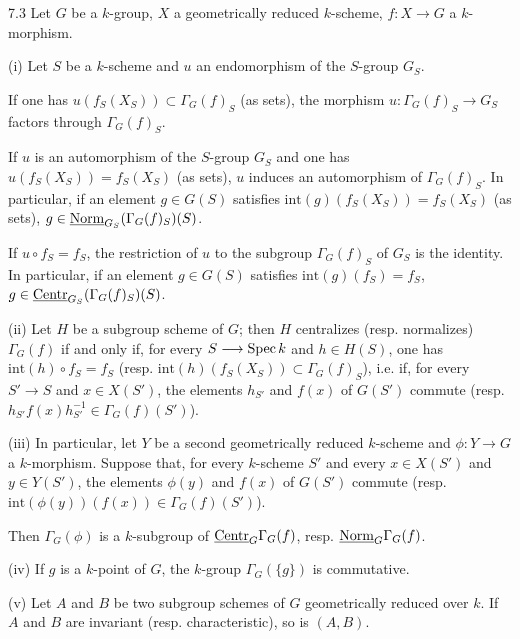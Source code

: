 \begin{corollary}{7.3}\label{VIB.7.3}
Let $G$ be a $k$-group, $X$ a geometrically reduced $k$-scheme, $f:X\to G$ a $k$-morphism.

(i) Let $S$ be a $k$-scheme and $u$ an endomorphism of the $S$-group $G_S$.
\begin{enumeratea}
\item If one has $u(f_S(X_S))\subset\Gamma_G(f)_S$ (as sets), the morphism $u:\Gamma_G(f)_S\to G_S$ factors through $\Gamma_G(f)_S$.
\item If $u$ is an automorphism of the $S$-group $G_S$ and one has $u(f_S(X_S))=f_S(X_S)$ (as sets), $u$ induces an automorphism of $\Gamma_G(f)_S$. In particular, if an element $g\in G(S)$ satisfies $\mathrm{int}(g)(f_S(X_S))=f_S(X_S)$ (as sets), $g\in\underline{\mathrm{Norm}}_{G_S}(\Gamma_G(f)_S)(S)$.
\item If $u\circ f_S=f_S$, the restriction of $u$ to the subgroup $\Gamma_G(f)_S$ of $G_S$ is the identity. In particular, if an element $g\in G(S)$ satisfies $\mathrm{int}(g)(f_S)=f_S$, $g\in\underline{\mathrm{Centr}}_{G_S}(\Gamma_G(f)_S)(S)$.
\end{enumeratea}
(ii) Let $H$ be a subgroup scheme of $G$; then $H$ centralizes (resp. normalizes) $\Gamma_G(f)$ if and only if, for every $S\longrightarrow\operatorname{Spec} k$ and $h\in H(S)$, one has $\mathrm{int}(h)\circ f_S=f_S$ (resp. $\mathrm{int}(h)(f_S(X_S))\subset\Gamma_G(f)_S$), i.e. if, for every $S'\to S$ and $x\in X(S')$, the elements $h_{S'}$ and $f(x)$ of $G(S')$ commute (resp. $h_{S'}f(x)h_{S'}^{-1}\in\Gamma_G(f)(S')$).

(iii) In particular, let $Y$ be a second geometrically reduced $k$-scheme and $\phi:Y\to G$ a $k$-morphism. Suppose that, for every $k$-scheme $S'$ and every $x\in X(S')$ and $y\in Y(S')$, the elements $\phi(y)$ and $f(x)$ of $G(S')$ commute (resp. $\mathrm{int}(\phi(y))(f(x))\in\Gamma_G(f)(S')$).

Then $\Gamma_G(\phi)$ is a $k$-subgroup of $\underline{\mathrm{Centr}}_G\Gamma_G(f)$, resp. $\underline{\mathrm{Norm}}_G\Gamma_G(f)$.

(iv) If $g$ is a $k$-point of $G$, the $k$-group $\Gamma_G(\{g\})$ is commutative.

(v) Let $A$ and $B$ be two subgroup schemes of $G$ geometrically reduced over $k$. If $A$ and $B$ are invariant (resp. characteristic), so is $(A,B)$.
\end{corollary}
